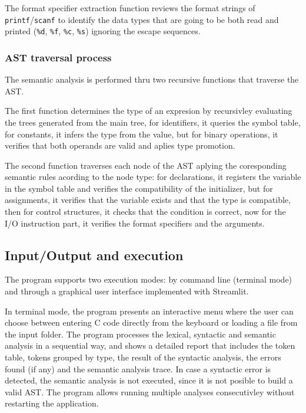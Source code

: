 \documentclass[letterpaper,12pt,oneside]{article}
\begin{document}
The format specifier extraction function reviews the format strings of \texttt{printf}/\texttt{scanf} to identify the data types that are going to be both read and printed (\texttt{\%d}, \texttt{\%f}, \texttt{\%c}, \texttt{\%s}) ignoring the escape sequences.

\subsubsection{AST traversal process}

The semantic analysis is performed thru two recursive functions that traverse the AST. 

The first function determines the type of an expresion by recursivley evaluating the trees generated from the main tree, for identifiers, it queries the symbol table, for constants, it infers the type from the value, but for binary operations, it verifies that both operands are valid and aplies type promotion. 

The second function traverses each node of the AST aplying the coresponding semantic rules acording to the node type: for declarations, it registers the variable in the symbol table and verifies the compatibility of the initializer, but for assignments, it verifies that the variable exists and that the type is compatible, then for control structures, it checks that the condition is correct, now for the I/O instruction part, it verifies the format specifiers and the arguments.


\subsection{Input/Output and execution}

The program supports two execution modes: by command line (terminal mode) and through a graphical user interface implemented with Streamlit.

In terminal mode, the program presents an interactive menu where the user can choose between entering C code directly from the keyboard or loading a file from the input folder. The program processes the lexical, syntactic and semantic analysis in a sequential way, and shows a detailed report that includes the token table, tokens grouped by type, the result of the syntactic analysis, the errors found (if any) and the semantic analysis trace. In case a syntactic error is detected, the semantic analysis is not executed, since it is not posible to build a valid AST. The program allows running multiple analyses consecutivley without restarting the application.
\end{document}
